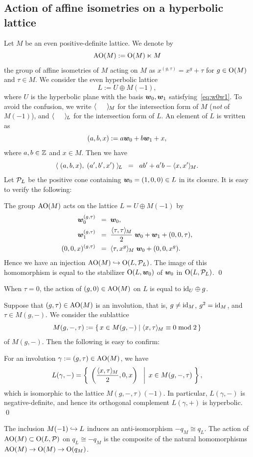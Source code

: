 \documentclass{amsart} %
\begin{document}
\subsection{Action of affine isometries on a hyperbolic lattice}\label{subsec:AOGM}
%
Let $M$ be an even positive-definite lattice.
We denote by 
\[
\mathord{\mathrm{AO}}(M):=\mathord{\mathrm{O}}(M)\ltimes M
\]
 the group of affine isometries of $M$
acting on $M$ as $x^{(g, \tau)}=x^g+\tau$
for $g\in \mathord{\mathrm{O}}(M)$ and $\tau\in M$.
We consider the even hyperbolic lattice
\[
L:=U\oplus M(-1),
\]
where $U$ is the hyperbolic plane with the basis $\boldsymbol{w}_0, \boldsymbol{w}_1$
satisfying~\eqref{eq:w0w1}.
To avoid the confusion, we write $\langle \phantom{a,a} \rangle_{\hskip -1pt M}$
for the intersection form of $M$ (\emph{not} of $M(-1)$),
and $\langle \phantom{a,a} \rangle_{\hskip -1pt L}$
for the intersection form of $L$.
An element of $L$ is written as 
\[
(a, b, x):=a\boldsymbol{w}_0+b \boldsymbol{w}_1+ x,
\]
where $a, b\in \mathord{\mathbb{Z}}$ and $x\in M$.
Then we have
\[
\langle \; (a, b, x), \; (a^{\prime}, b^{\prime}, x^{\prime})\; \rangle_{\hskip -1pt L}\;\;=\;\; ab^{\prime}+a^{\prime} b-\langle x, x^{\prime} \rangle_{\hskip -1pt M}.
\]
Let $\mathord{\mathcal{P}}_L$ be the positive cone containing 
$\boldsymbol{w}_0=(1,0, 0)\in L$ in its closure.
It is easy to verify the following:
%
\begin{proposition}\label{prop:embeddingAOG}
The group $\mathord{\mathrm{AO}}(M)$ acts on the lattice $L=U\oplus M(-1)$
by
%
\begin{align*}
\boldsymbol{w}_0^{(g, \tau)} \;\;=\;\; & \boldsymbol{w}_0, \\
\boldsymbol{w}_1^{(g, \tau)} \;\;=\;\; & \frac{\langle \tau, \tau \rangle_{\hskip -1pt M}}{2}\;\boldsymbol{w}_0+\boldsymbol{w}_1+(0,0,\tau), \\
(0,0,x)^{(g, \tau)} \;\;=\;\; &\langle \tau, x^g \rangle_{\hskip -1pt M} \;\boldsymbol{w}_0 + (0,0, x^g).
\end{align*}
Hence we have an injection $\mathord{\mathrm{AO}}(M)\hookrightarrow \mathord{\mathrm{O}}(L, \mathord{\mathcal{P}}_L)$.
The image of this homomorphism is equal to
the stabilizer $\mathord{\mathrm{O}}(L, \boldsymbol{w}_0)$ of $\boldsymbol{w}_0$ in $\mathord{\mathrm{O}}(L, \mathord{\mathcal{P}}_L)$.
\qed
%
\end{proposition}
%
\begin{remark}\label{rem:tau0}
When $\tau=0$, the action of $(g, 0)\in \mathord{\mathrm{AO}}(M)$ on $L$ 
is equal to $\mathord{\mathrm{id}}_U\oplus g$.
\end{remark}
%
Suppose that $(g, \tau)\in \mathord{\mathrm{AO}}(M)$ is an involution, 
that is, $g\ne \mathord{\mathrm{id}}_M$, $g^2=\mathord{\mathrm{id}}_M$, and $\tau\in M(g, -)$.
We consider the sublattice 
\[
M(g, -,\tau):=\{\,{x\in M(g, -)}\mid {\langle x, \tau \rangle_{\hskip -1pt M}\equiv 0 \bmod 2} \,\}
\]
of $M(g, -)$.
Then the following is easy to confirm:
%
\begin{proposition}\label{prop:involL}
For an involution $\gamma:=(g, \tau)\in \mathord{\mathrm{AO}}(M)$, we have 
\[
L(\gamma, -)=\left\{\; \left. {\left(\frac{\langle x, \tau \rangle_{\hskip -1pt M}}{2}, 0, x\right)\;\;} \; \right\vert \; {x \in M(g, -,\tau)} \; \right \},
\]
which is isomorphic to 
the lattice $M(g, -,\tau)(-1)$.
In particular, 
$L(\gamma, -)$ is negative-definite, and 
hence its orthogonal complement $L(\gamma, +)$ is hyperbolic.
\qed
\end{proposition}
%
\begin{remark}
The inclusion $M(-1)\hookrightarrow L$ induces an anti-isomorphism $-q_M\cong q_L$.
The action of $\mathord{\mathrm{AO}}(M)\subset \mathord{\mathrm{O}}(L, \mathord{\mathcal{P}})$ on $q_L\cong -q_M$ 
is the composite of the natural homomorphisms $\mathord{\mathrm{AO}}(M) \to \mathord{\mathrm{O}}(M)\to \mathord{\mathrm{O}}(q_M)$.
\end{remark}
%
\end{document}
